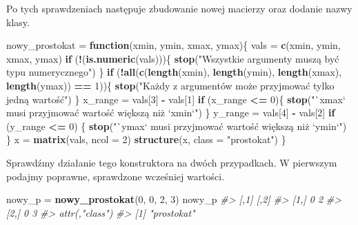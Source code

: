 \documentclass[paper=6in:9in,pagesize=pdftex,headinclude=on,footinclude=on,10pt]{scrbook}
\newenvironment{Shaded}{\begin{snugshade}}{\end{snugshade}}
\newcommand{\CommentTok}[1]{\textcolor[rgb]{0.56,0.35,0.01}{\textit{#1}}}
\newcommand{\ControlFlowTok}[1]{\textcolor[rgb]{0.13,0.29,0.53}{\textbf{#1}}}
\newcommand{\DataTypeTok}[1]{\textcolor[rgb]{0.13,0.29,0.53}{#1}}
\newcommand{\DecValTok}[1]{\textcolor[rgb]{0.00,0.00,0.81}{#1}}
\newcommand{\KeywordTok}[1]{\textcolor[rgb]{0.13,0.29,0.53}{\textbf{#1}}}
\newcommand{\NormalTok}[1]{#1}
\newcommand{\OperatorTok}[1]{\textcolor[rgb]{0.81,0.36,0.00}{\textbf{#1}}}
\newcommand{\StringTok}[1]{\textcolor[rgb]{0.31,0.60,0.02}{#1}}
\begin{document}
Po tych sprawdzeniach następuje zbudowanie nowej macierzy oraz dodanie nazwy klasy.

\begin{Shaded}
\begin{Highlighting}[]
\NormalTok{nowy_prostokat =}\StringTok{ }\ControlFlowTok{function}\NormalTok{(xmin, ymin, xmax, ymax)\{}
\NormalTok{  vals =}\StringTok{ }\KeywordTok{c}\NormalTok{(xmin, ymin, xmax, ymax)}
  \ControlFlowTok{if}\NormalTok{ (}\OperatorTok{!}\NormalTok{(}\KeywordTok{is.numeric}\NormalTok{(vals)))\{}
    \KeywordTok{stop}\NormalTok{(}\StringTok{"Wszystkie argumenty muszą być typu numerycznego"}\NormalTok{)}
\NormalTok{  \}}
  \ControlFlowTok{if}\NormalTok{ (}\OperatorTok{!}\KeywordTok{all}\NormalTok{(}\KeywordTok{c}\NormalTok{(}\KeywordTok{length}\NormalTok{(xmin), }\KeywordTok{length}\NormalTok{(ymin), }\KeywordTok{length}\NormalTok{(xmax), }\KeywordTok{length}\NormalTok{(ymax)) }\OperatorTok{==}\StringTok{ }\DecValTok{1}\NormalTok{))\{}
    \KeywordTok{stop}\NormalTok{(}\StringTok{"Każdy z argumentów może przyjmować tylko jedną wartość"}\NormalTok{)}
\NormalTok{  \}}
\NormalTok{  x_range =}\StringTok{ }\NormalTok{vals[}\DecValTok{3}\NormalTok{] }\OperatorTok{-}\StringTok{ }\NormalTok{vals[}\DecValTok{1}\NormalTok{]}
  \ControlFlowTok{if}\NormalTok{ (x_range }\OperatorTok{<=}\StringTok{ }\DecValTok{0}\NormalTok{)\{}
    \KeywordTok{stop}\NormalTok{(}\StringTok{"`xmax` musi przyjmować wartość większą niż `xmin`"}\NormalTok{)}
\NormalTok{  \}}
\NormalTok{  y_range =}\StringTok{ }\NormalTok{vals[}\DecValTok{4}\NormalTok{] }\OperatorTok{-}\StringTok{ }\NormalTok{vals[}\DecValTok{2}\NormalTok{]}
  \ControlFlowTok{if}\NormalTok{ (y_range }\OperatorTok{<=}\StringTok{ }\DecValTok{0}\NormalTok{) \{}
    \KeywordTok{stop}\NormalTok{(}\StringTok{"`ymax` musi przyjmować wartość większą niż `ymin`"}\NormalTok{)}
\NormalTok{  \}}
\NormalTok{  x =}\StringTok{ }\KeywordTok{matrix}\NormalTok{(vals, }\DataTypeTok{ncol =} \DecValTok{2}\NormalTok{)}
  \KeywordTok{structure}\NormalTok{(x, }\DataTypeTok{class =} \StringTok{"prostokat"}\NormalTok{)}
\NormalTok{\}}
\end{Highlighting}
\end{Shaded}

Sprawdźmy działanie tego konstruktora na dwóch przypadkach.
W pierwszym podajmy poprawne, sprawdzone wcześniej wartości.

\begin{Shaded}
\begin{Highlighting}[]
\NormalTok{nowy_p =}\StringTok{ }\KeywordTok{nowy_prostokat}\NormalTok{(}\DecValTok{0}\NormalTok{, }\DecValTok{0}\NormalTok{, }\DecValTok{2}\NormalTok{, }\DecValTok{3}\NormalTok{)}
\NormalTok{nowy_p}
\CommentTok{#>      [,1] [,2]}
\CommentTok{#> [1,]    0    2}
\CommentTok{#> [2,]    0    3}
\CommentTok{#> attr(,"class")}
\CommentTok{#> [1] "prostokat"}
\end{Highlighting}
\end{Shaded}
\end{document}
